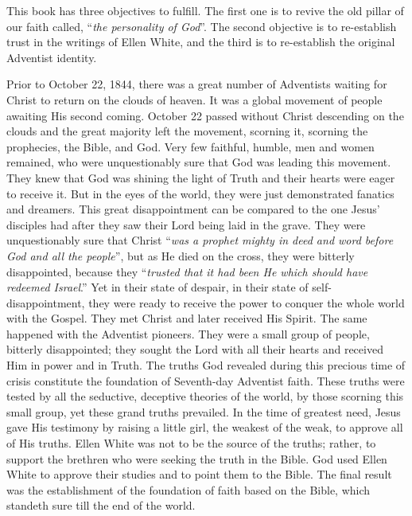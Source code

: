 

This book has three objectives to fulfill. The first one is to revive the old pillar of our faith called, “\textit{the personality of God}”. The second objective is to re-establish trust in the writings of Ellen White, and the third is to re-establish the original Adventist identity.

Prior to October 22, 1844, there was a great number of Adventists waiting for Christ to return on the clouds of heaven. It was a global movement of people awaiting His second coming. October 22 passed without Christ descending on the clouds and the great majority left the movement, scorning it, scorning the prophecies, the Bible, and God. Very few faithful, humble, men and women remained, who were unquestionably sure that God was leading this movement. They knew that God was shining the light of Truth and their hearts were eager to receive it. But in the eyes of the world, they were just demonstrated fanatics and dreamers. This great disappointment can be compared to the one Jesus’ disciples had after they saw their Lord being laid in the grave. They were unquestionably sure that Christ “\textit{was a prophet mighty in deed and word before God and all the people}”, but as He died on the cross, they were bitterly disappointed, because they “\textit{trusted that it had been He which should have redeemed Israel}.” Yet in their state of despair, in their state of self-disappointment, they were ready to receive the power to conquer the whole world with the Gospel. They met Christ and later received His Spirit. The same happened with the Adventist pioneers. They were a small group of people, bitterly disappointed; they sought the Lord with all their hearts and received Him in power and in Truth. The truths God revealed during this precious time of crisis constitute the foundation of Seventh-day Adventist faith. These truths were tested by all the seductive, deceptive theories of the world, by those scorning this small group, yet these grand truths prevailed. In the time of greatest need, Jesus gave His testimony by raising a little girl, the weakest of the weak, to approve all of His truths. Ellen White was not to be the source of the truths; rather, to support the brethren who were seeking the truth in the Bible. God used Ellen White to approve their studies and to point them to the Bible. The final result was the establishment of the foundation of faith based on the Bible, which standeth sure till the end of the world.

